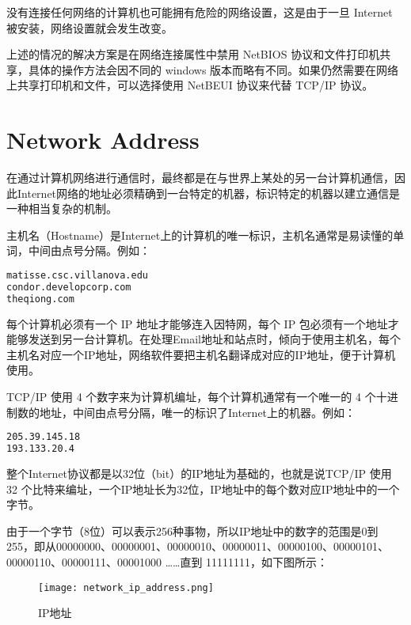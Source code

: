 没有连接任何网络的计算机也可能拥有危险的网络设置，这是由于一旦 Internet 被安装，网络设置就会发生改变。

上述的情况的解决方案是在网络连接属性中禁用 NetBIOS 协议和文件打印机共享，具体的操作方法会因不同的 windows 版本而略有不同。如果仍然需要在网络上共享打印机和文件，可以选择使用 NetBEUI 协议来代替 TCP/IP 协议。







\chapter{Network Address}

在通过计算机网络进行通信时，最终都是在与世界上某处的另一台计算机通信，因此Internet网络的地址必须精确到一台特定的机器，标识特定的机器以建立通信是一种相当复杂的机制。

主机名（Hostname）是Internet上的计算机的唯一标识，主机名通常是易读懂的单词，中间由点号分隔。例如：

\begin{lstlisting}[language=HTML]
matisse.csc.villanova.edu
condor.developcorp.com
theqiong.com
\end{lstlisting}


每个计算机必须有一个 IP 地址才能够连入因特网，每个 IP 包必须有一个地址才能够发送到另一台计算机。在处理Email地址和站点时，倾向于使用主机名，每个主机名对应一个IP地址，网络软件要把主机名翻译成对应的IP地址，便于计算机使用。

TCP/IP 使用 4 个数字来为计算机编址，每个计算机通常有一个唯一的 4 个十进制数的地址，中间由点号分隔，唯一的标识了Internet上的机器。例如：


\begin{lstlisting}[language=HTML]
205.39.145.18
193.133.20.4
\end{lstlisting}


整个Internet协议都是以32位（bit）的IP地址为基础的，也就是说TCP/IP 使用 32 个比特来编址，一个IP地址长为32位，IP地址中的每个数对应IP地址中的一个字节。

由于一个字节（8位）可以表示256种事物，所以IP地址中的数字的范围是0到255，即从00000000、00000001、00000010、00000011、00000100、00000101、00000110、00000111、00001000 ……直到 11111111，如下图所示：

\begin{figure}[!h]
\centering
\texttt{[image: network\_ip\_address.png]}
\caption{IP地址}
\label{network_ip_address}
\end{figure}




